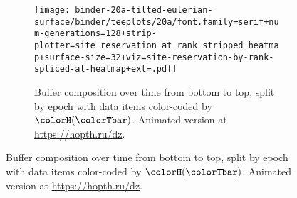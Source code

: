 \begin{figure*}[htbp!]
\begin{subfigure}[b]{\linewidth}
\texttt{[image: 
binder-20a-tilted-eulerian-surface/binder/teeplots/20a/font.family=serif+num-generations=128+strip-plotter=site\_reservation\_at\_rank\_stripped\_heatmap+surface-size=32+viz=site-reservation-by-rank-spliced-at-heatmap+ext=.pdf]}
\vspace{-4.5ex}\caption{\footnotesize
  Buffer composition over time from bottom to top, split by epoch with data items color-coded by \hv{} $\colorH(\colorTbar)$.
  Animated version at \url{https://hopth.ru/dz}.
}
\label{fig:hsurf-tilted-implementation-schematic}
\end{subfigure}




\end{figure*}
